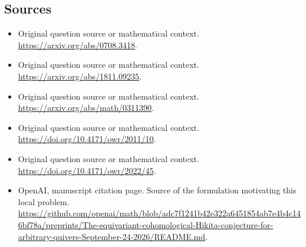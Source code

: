 \documentclass[11pt]{article}
\begin{document}
\subsection{Sources}
\begin{itemize}
\item[S1] Original question source or mathematical context.
\url{https://arxiv.org/abs/0708.3418}.
\item[S2] Original question source or mathematical context.
\url{https://arxiv.org/abs/1811.09235}.
\item[S3] Original question source or mathematical context.
\url{https://arxiv.org/abs/math/0311390}.
\item[S4] Original question source or mathematical context.
\url{https://doi.org/10.4171/owr/2011/10}.
\item[S5] Original question source or mathematical context.
\url{https://doi.org/10.4171/owr/2022/45}.
\item[S6] OpenAI, manuscript citation page. Source of the formulation motivating this local problem.
\url{https://github.com/openai/math/blob/adc7f1241b42e322a6451854ab7e4b4c146bf78a/preprints/The-equivariant-cohomological-Hikita-conjecture-for-arbitrary-quivers-September-24-2026/README.md}.
\end{itemize}
\end{document}
